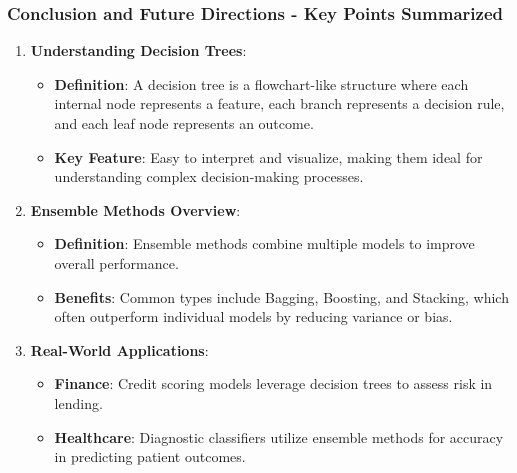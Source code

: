 \documentclass{beamer}
\begin{document}
\begin{frame}[fragile]
    \frametitle{Conclusion and Future Directions - Key Points Summarized}
    
    \begin{enumerate}
        
        \item \textbf{Understanding Decision Trees}:
            \begin{itemize}
                \item \textbf{Definition}: A decision tree is a flowchart-like structure where each internal node represents a feature, each branch represents a decision rule, and each leaf node represents an outcome.
                \item \textbf{Key Feature}: Easy to interpret and visualize, making them ideal for understanding complex decision-making processes.
            \end{itemize}
        
        \item \textbf{Ensemble Methods Overview}:
            \begin{itemize}
                \item \textbf{Definition}: Ensemble methods combine multiple models to improve overall performance.
                \item \textbf{Benefits}: Common types include Bagging, Boosting, and Stacking, which often outperform individual models by reducing variance or bias.
            \end{itemize}
        
        \item \textbf{Real-World Applications}:
            \begin{itemize}
                \item \textbf{Finance}: Credit scoring models leverage decision trees to assess risk in lending.
                \item \textbf{Healthcare}: Diagnostic classifiers utilize ensemble methods for accuracy in predicting patient outcomes.
            \end{itemize}
        
    \end{enumerate}
\end{frame}
\end{document}

